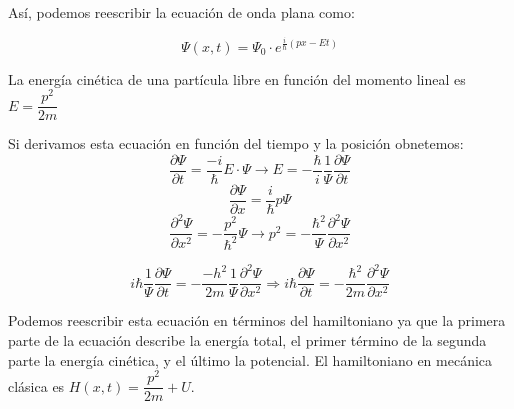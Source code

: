\documentclass{report}
\begin{document}
    \noindent Así, podemos reescribir la ecuación de onda plana como:

    \begin{equation}
      \Psi(x,t)=\Psi_0\cdot e^{\frac{i}{\hbar}(px-Et)}
    \end{equation}

    \noindent La energía cinética de una partícula libre en función del momento lineal
     es $E=\dfrac{p^2}{2m}$

    \noindent Si derivamos esta ecuación en función del tiempo y la posición obnetemos:
    \[\dfrac{\partial\Psi}{\partial t}= \dfrac{-i}{\hbar}E\cdot\Psi\rightarrow E=-\dfrac{\hbar}{i}
    \dfrac{1}{\Psi}\dfrac{\partial\Psi}{\partial t}\]
    \[\dfrac{\partial\Psi}{\partial x}=\dfrac{i}{\hbar}p\Psi\]
    \[\dfrac{\partial^2\Psi}{\partial x^2}=-\dfrac{p^2}{\hbar^2}\Psi\rightarrow p^2=-\dfrac{\hbar^2}
    {\Psi}\dfrac{\partial^2 \Psi}{\partial x^2}\]

    \begin{equation}
      i\hbar\dfrac{1}{\Psi}\dfrac{\partial\Psi}{\partial t}=-\dfrac{-h^2}{2m}\dfrac{1}{\Psi}
      \dfrac{\partial^2\Psi}{\partial x^2}\Longrightarrow\boxed{i\hbar\dfrac{\partial\Psi}{\partial t}=
      -\dfrac{\hbar^2}{2m}\dfrac{\partial^2\Psi}{\partial x^2}}
      \label{eq:SchrodingerParticulaLibre}
    \end{equation}

    \noindent Podemos reescribir esta ecuación en términos del hamiltoniano ya que la primera 
    parte de la ecuación describe la energía total, el primer término de la segunda parte la energía
    cinética, y el último la potencial. El hamiltoniano en mecánica clásica es 
    $H(x,t)=\dfrac{p^2}{2m}+U$.
\end{document}
